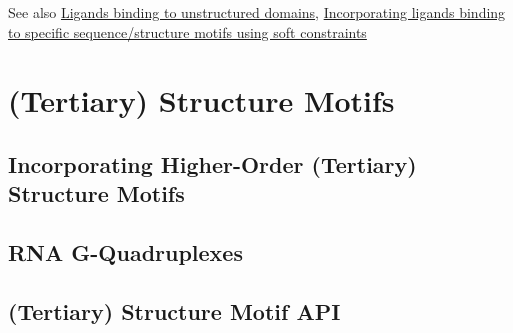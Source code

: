 \begin{DoxySeeAlso}{See also}
\hyperlink{group__ligands__up}{Ligands binding to unstructured domains}, \hyperlink{group__constraints__ligand}{Incorporating ligands binding to specific sequence/structure motifs using soft constraints}
\end{DoxySeeAlso}
 \hypertarget{structure_motifs}{}\section{(Tertiary) Structure Motifs}\label{structure_motifs}
\hypertarget{structure_motifs_structure_motifs_intro}{}\subsection{Incorporating Higher-\/\+Order (\+Tertiary) Structure Motifs}\label{structure_motifs_structure_motifs_intro}
\hypertarget{structure_motifs_structure_motif_gquad}{}\subsection{R\+N\+A G-\/\+Quadruplexes}\label{structure_motifs_structure_motif_gquad}
\hypertarget{structure_motifs_structure_motif_api}{}\subsection{(\+Tertiary) Structure Motif A\+PI}\label{structure_motifs_structure_motif_api}
 
